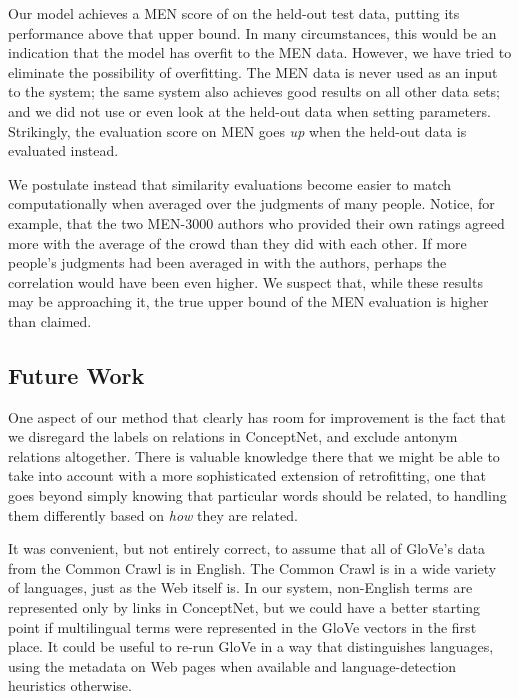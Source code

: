 \documentclass[11pt]{article}
\begin{document}
Our model achieves a MEN score of \scoreMEN{} on the
held-out test data, putting its performance above that upper bound. In many
circumstances, this would be an indication that the model has overfit to the
MEN data. However, we have tried to eliminate the possibility of overfitting.
The MEN data is never used as an input to the system; the same system also
achieves good results on all other data sets; and we did not use or even
look at the held-out data when setting parameters. Strikingly, the evaluation
score on MEN goes {\em up} when the held-out data is evaluated instead.

We postulate instead that similarity evaluations become easier to match
computationally when averaged over the judgments of many people. Notice, for
example, that the two MEN-3000 authors who provided their own ratings
agreed more with the average of the crowd than they did with each other.
If more people's judgments had been averaged in with the authors, perhaps the
correlation would have been even higher. We suspect that, while these results
may be approaching it, the true upper bound of the MEN evaluation is higher than
claimed.

\subsection{Future Work}


One aspect of our method that clearly has room for improvement is the fact that
we disregard the labels on relations in ConceptNet, and exclude antonym
relations altogether. There is valuable knowledge there that we might be able
to take into account with a more sophisticated extension of retrofitting, one
that goes beyond simply knowing that particular words should be related, to
handling them differently based on {\em how} they are related.

It was convenient, but not entirely correct, to assume that all of GloVe's data
from the Common Crawl is in English. The Common Crawl is in a wide variety of
languages, just as the Web itself is. In our system, non-English terms are
represented only by links in ConceptNet, but we could have a better starting
point if multilingual terms were represented in the GloVe vectors in the first
place. It could be useful to re-run GloVe in a way that distinguishes languages,
using the metadata on Web pages when available and language-detection heuristics
otherwise.
\end{document}
